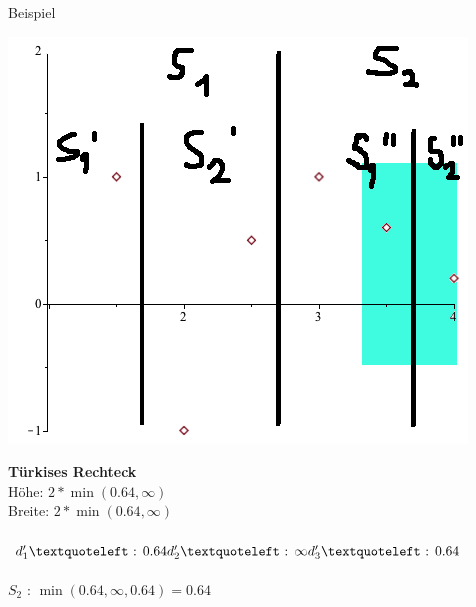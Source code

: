\documentclass[18pt]{beamer}
\begin{document}
		\begin{frame}{Beispiel}
			\begin{minipage}{0.45\textwidth}
				\includegraphics[width =\textwidth]{logos/PlotsBetter0g.png}
			\end{minipage}
			\begin{minipage}{0.45\textwidth}
				\textbf{Türkises Rechteck}\\
				Höhe: $ 2 * \min(0.64, \infty)$\\ Breite: $2 * \min(0.64, \infty) $\\
				\ \\
				$d_1'‘ \text{ : }  0.64 \\
				d_2'‘  \text{ : }  \infty \\
				d_3'‘  \text{ : }  0.64$ \\ 
				\ \\
				$S_2 \text{ : } \min(0.64, \infty, 0.64) = 0.64$
			\end{minipage}
		\end{frame}
\end{document}
